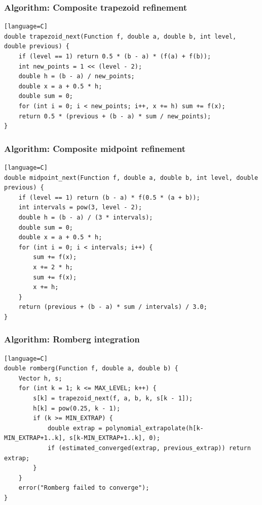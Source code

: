 \documentclass[11pt]{article}
\begin{document}
\subsubsection{Algorithm: Composite trapezoid refinement}\label{algorithm-composite-trapezoid-refinement}

\begin{verbatim}[language=C]
double trapezoid_next(Function f, double a, double b, int level, double previous) {
    if (level == 1) return 0.5 * (b - a) * (f(a) + f(b));
    int new_points = 1 << (level - 2);
    double h = (b - a) / new_points;
    double x = a + 0.5 * h;
    double sum = 0;
    for (int i = 0; i < new_points; i++, x += h) sum += f(x);
    return 0.5 * (previous + (b - a) * sum / new_points);
}
\end{verbatim}

\subsubsection{Algorithm: Composite midpoint refinement}\label{algorithm-composite-midpoint-refinement}

\begin{verbatim}[language=C]
double midpoint_next(Function f, double a, double b, int level, double previous) {
    if (level == 1) return (b - a) * f(0.5 * (a + b));
    int intervals = pow(3, level - 2);
    double h = (b - a) / (3 * intervals);
    double sum = 0;
    double x = a + 0.5 * h;
    for (int i = 0; i < intervals; i++) {
        sum += f(x);
        x += 2 * h;
        sum += f(x);
        x += h;
    }
    return (previous + (b - a) * sum / intervals) / 3.0;
}
\end{verbatim}

\subsubsection{Algorithm: Romberg integration}\label{algorithm-romberg-integration}

\begin{verbatim}[language=C]
double romberg(Function f, double a, double b) {
    Vector h, s;
    for (int k = 1; k <= MAX_LEVEL; k++) {
        s[k] = trapezoid_next(f, a, b, k, s[k - 1]);
        h[k] = pow(0.25, k - 1);
        if (k >= MIN_EXTRAP) {
            double extrap = polynomial_extrapolate(h[k-MIN_EXTRAP+1..k], s[k-MIN_EXTRAP+1..k], 0);
            if (estimated_converged(extrap, previous_extrap)) return extrap;
        }
    }
    error("Romberg failed to converge");
}
\end{verbatim}
\end{document}
